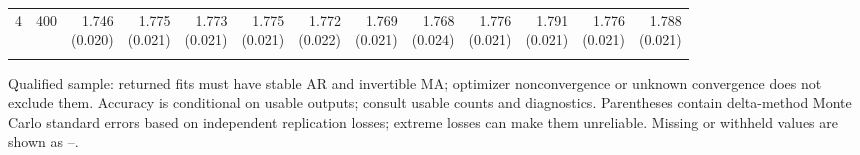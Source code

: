 \begin{table}[p]
{\begin{tabular}{llrrrrrrrrrrr}
4 & 400 & \shortstack{1.746\\(0.020)} & \shortstack{1.775\\(0.021)} & \shortstack{1.773\\(0.021)} & \shortstack{1.775\\(0.021)} & \shortstack{1.772\\(0.022)} & \shortstack{1.769\\(0.021)} & \shortstack{1.768\\(0.024)} & \shortstack{1.776\\(0.021)} & \shortstack{1.791\\(0.021)} & \shortstack{1.776\\(0.021)} & \shortstack{1.788\\(0.021)} \\
\addlinespace
\bottomrule\end{tabular}}
\par\medskip
\begin{minipage}{\linewidth}\footnotesize Qualified sample: returned fits must have stable AR and invertible MA; optimizer nonconvergence or unknown convergence does not exclude them. Accuracy is conditional on usable outputs; consult usable counts and diagnostics. Parentheses contain delta-method Monte Carlo standard errors based on independent replication losses; extreme losses can make them unreliable.  Missing or withheld values are shown as --.\end{minipage}
\end{table}
